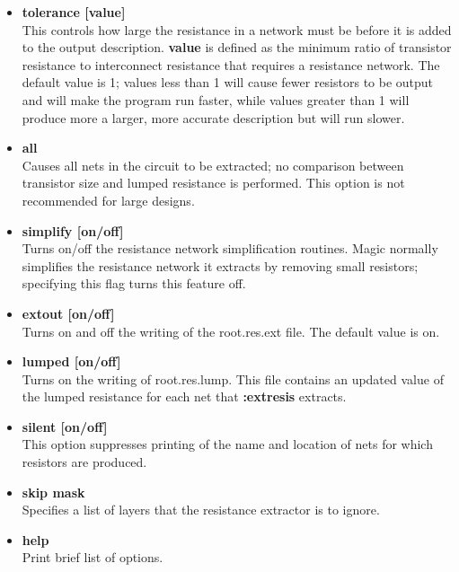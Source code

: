 \documentclass[letterpaper,twoside,12pt]{article}
\begin{document}
\begin{itemize}
   \item {\bfseries tolerance [value]} \\ This controls how large the
	resistance in a network must be before it is added to the
	output description. {\bfseries value} is defined as the minimum
	ratio of transistor resistance to interconnect resistance that
	requires a resistance network.  The default value is 1; values
	less than 1 will cause fewer resistors to be output and will make
	the program run faster, while values greater than 1 will produce
	more a larger, more accurate description but will  run slower.

   \item {\bfseries all} \\ Causes all nets in the circuit to be extracted;
	no comparison between transistor size and lumped resistance is
	performed.  This option is not recommended for large designs.

   \item {\bfseries simplify [on/off]} \\ Turns on/off the resistance network
	simplification routines.  Magic normally simplifies the resistance
	network it extracts by removing small resistors; specifying this flag
	turns this feature off.

   \item {\bfseries extout [on/off]} \\ Turns on and off the writing of the
	{\ttfamily root.res.ext} file.  The default value is on.

   \item {\bfseries lumped [on/off]} \\ Turns on the writing of
	{\ttfamily root.res.lump}.  This file contains an updated
	value of the lumped resistance for each net that
	{\bfseries :extresis} extracts.  

   \item {\bfseries silent [on/off]} \\ This option suppresses printing
	of the name and location of nets for which resistors are produced.

   \item {\bfseries skip mask} \\ Specifies a list of layers that the
	resistance extractor is to ignore.

   \item {\bfseries help} \\ Print brief list of options.
\end{itemize}
\end{document}
